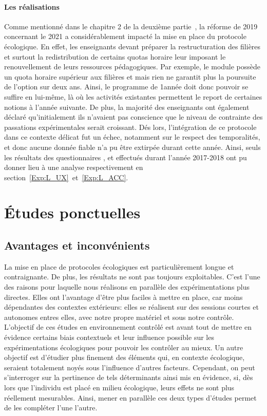         \paragraph{Les réalisations}\label{sec:limit_proto}
            Comme mentionné dans le chapitre 2 de la deuxième partie~, la réforme de 2019 concernant le  2021 a considérablement impacté la mise en place du protocole écologique. En effet, les enseignants devant préparer la restructuration des filières et surtout la redistribution de certains quotas horaire leur imposant le renouvellement de leurs ressources pédagogiques. Par exemple, le module  possède un quota horaire supérieur aux filières  et  mais rien ne garantit plus la poursuite de l'option sur deux ans. Ainsi, le programme de 1\iere année doit donc pouvoir se suffire en lui-même, là où les activités existantes permettent le report de certaines notions à l'année suivante. De plus, la majorité des enseignants ont également déclaré qu'initialement ils n'avaient pas conscience que le niveau de contrainte des passations expérimentales serait croissant.
            Dés lors, l'intégration de ce protocole dans ce contexte délicat fut un échec, notamment sur le respect des temporalités, et donc aucune donnée fiable n'a pu être extirpée durant cette année. Ainsi, seuls les résultats des questionnaires ,  et  effectués durant l'année 2017-2018 ont pu donner lieu à une analyse respectivement en section~\ref{Exp:L_UX}~et~\ref{Exp:L_ACC}.
\section{Études ponctuelles}
  \subsection{Avantages et inconvénients}
    La mise en place de protocoles écologiques est particulièrement longue et contraignante. De plus, les résultats ne sont pas toujours exploitables. 
    C'est l'une des raisons pour laquelle nous réalisons en parallèle des expérimentations plus directes. Elles ont l'avantage d'être plus faciles à mettre en place, car moins dépendantes des contextes extérieurs: elles se réalisent sur des sessions courtes et autonomes entres elles, avec notre propre matériel et sous notre contrôle.
    L'objectif de ces études en environnement contrôlé est avant tout de mettre en évidence certains biais contextuels et leur influence possible sur les expérimentations écologiques pour pouvoir les contrôler au mieux. Un autre objectif est d'étudier plus finement des éléments qui, en contexte écologique, seraient totalement noyés sous l'influence d'autres facteurs. Cependant, on peut s'interroger sur la pertinence de tels déterminants ainsi mis en évidence, si, dès lors que l'individu est placé en milieu écologique, leurs effets ne sont plus réellement mesurables.
    Ainsi, mener en parallèle ces deux types d'études permet de les compléter l'une l'autre.
